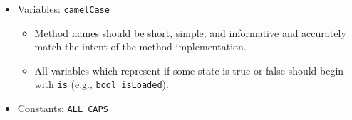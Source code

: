 \begin{itemize}
\begin{itemize}
\begin{itemize}
            \item Method names should be short, simple, and informative and accurately match the intent of the method implementation.
            \item All methods which are used to determine if some state is true or false should begin with \texttt{is} (e.g., \texttt{bool isValidData(Data\& data)}).
            \item All methods which are used to access or return private member variables should begin with \texttt{get} (e.g., \texttt{Data\& getDataReference()}).
            \item All methods which are used to set private member variables should begin with \texttt{set} (e.g., \texttt{void setDataReference(Data\& data)}).
        \end{itemize}
        \item Variables: \texttt{camelCase}
        \begin{itemize}
            \item Method names should be short, simple, and informative and accurately match the intent of the method implementation.
            \item All variables which represent if some state is true or false should begin with \texttt{is} (e.g., \texttt{bool isLoaded}).
        \end{itemize}
        \item Constants: \texttt{ALL\_CAPS} 
    \end{itemize}
\end{itemize}

